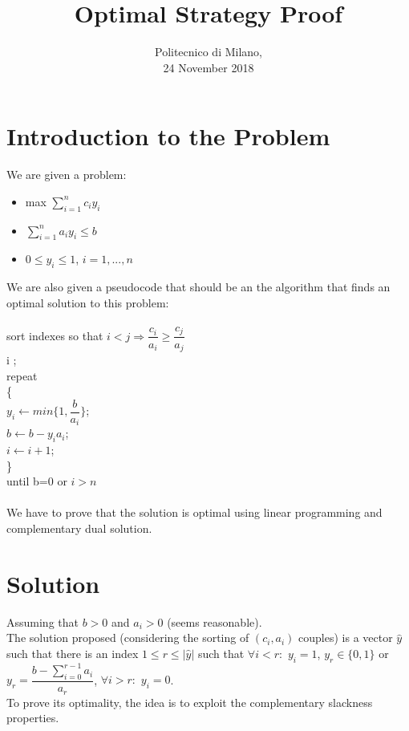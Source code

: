 \documentclass[1pt]{article}
\title{\huge \textrm{Optimal Strategy Proof}}
\date{\textrm{Politecnico di Milano, \\24 November 2018}}
\begin{document}
	\begin{titlepage}
		\maketitle
	\end{titlepage}


	\newpage
	\section{Introduction to the Problem}
		We are given a problem:
		\begin{itemize}
			\item max $\sum_{i=1}^n c_iy_i$
			\item $\sum_{i=1}^n a_iy_i \leqslant b$
			\item $0 \leqslant y_i \leqslant 1$, $i = 1,...,n$  
		\end{itemize}
		We are also given a pseudocode that should be an the algorithm that finds an  optimal solution to this problem:\\\\
		sort indexes so that $i<j \Rightarrow \dfrac{c_i}{a_i} \geqslant \dfrac{c_j}{a_j}$\\
		i ;\\
		repeat\\
		\{\\
		$y_i \gets min\{1,\dfrac{b}{a_i}\}$;\\
		$b \gets b - y_ia_i$;\\
		$i \gets i+1$;\\
		\}\\
		until b=0 or $i>n$\\\\
		We have to prove that the solution is optimal using linear programming and complementary dual solution.

	\section{Solution}
	Assuming that $b>0$ and $a_i>0$ (seems reasonable).\\
	The solution proposed (considering the sorting of $(c_i,a_i)$ couples) is a vector $\hat{y}$ such that there is an index $1 \leqslant r \leqslant |\hat{y}|$ such that $\forall i < r:$ $y_i = 1$, $y_r \in \{0,1\}$ or $y_r = \dfrac{b-\sum_{i=0}^{r-1} a_i}{a_r}$, $\forall i>r:$ $y_i=0$. \\
	To prove its optimality, the idea is to exploit the complementary slackness properties.\\
\end{document}
